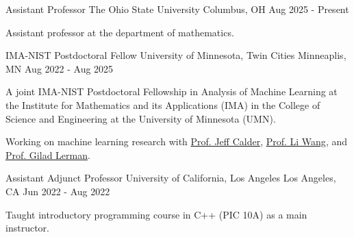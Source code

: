 

\begin{cventries}

\cventry
    {Assistant Professor} %
    {The Ohio State University} %
    {Columbus, OH} %
    {Aug 2025 - Present} %
    {
      \begin{cvitems} %
        \item {Assistant professor at the department of mathematics.}
      \end{cvitems}
    }

  \cventry
    {IMA-NIST Postdoctoral Fellow} %
    {University of Minnesota, Twin Cities} %
    {Minneaplis, MN} %
    {Aug 2022 - Aug 2025} %
    {
      \begin{cvitems} %
        \item {A joint IMA-NIST Postdoctoral Fellowship in Analysis of Machine Learning at the Institute for Mathematics and its Applications (IMA) in the College of Science and Engineering at the University of Minnesota (UMN).}
        \item {Working on machine learning research with \href{https://www-users.cse.umn.edu/~jwcalder/}{Prof. Jeff Calder}, \href{https://liwang-umn.github.io/math/}{Prof. Li Wang}, and \href{https://www-users.cse.umn.edu/~lerman/}{Prof. Gilad Lerman}.}
      \end{cvitems}
    }

  \cventry
    {Assistant Adjunct Professor} %
    {University of California, Los Angeles} %
    {Los Angeles, CA} %
    {Jun 2022 - Aug 2022} %
    {
      \begin{cvitems} %
        \item {Taught introductory programming course in C++ (PIC 10A) as a main instructor.}
      \end{cvitems}
    }

\end{cventries}
